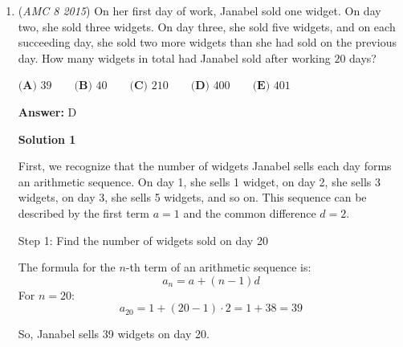 \begin{enumerate}
\textbf{Solution}

We know from the \href{https://artofproblemsolving.com/wiki/index.php?title=Triangle\_Inequality}{Triangle Inequality} that the last side, $s$, fulfills $s<5+19=24$. Adding $5+19$ to both sides of the inequality, we get $s+5+19<48$, and because $s+5+19$ is the perimeter of our triangle, $\boxed{\textbf{(D)}\ 48}$ is our answer.

 


 



\textbf{Solution 2}

$s$, fulfills $s<5+19=24$, meaning that s<24. The greatest value of s can be 23. 23+5+19 is 47. Since 48 is our nearest answer choice, the answer is $\boxed{\textbf{(D)}\ 48}$.-TheNerdWhoIsNerdy.

 minor edit by themathkidwoohooooo:the greatest value of s is 24-$e$, where $e$ represents an infinitesimal (a constant smaller than any positive number but not zero or negative. it is between the positives and 0. another way to think of it is $\frac {1} {\infty}$). NOT 23!!!!!!!!!!!!!!!

 


	\item (\textit{AMC 8 2015}) On her first day of work, Janabel sold one widget. On day two, she sold three widgets. On day three, she sold five widgets, and on each succeeding day, she sold two more widgets than she had sold on the previous day. How many widgets in total had Janabel sold after working $20$ days?


 $\textbf{(A) }39\qquad\textbf{(B) }40\qquad\textbf{(C) }210\qquad\textbf{(D) }400\qquad \textbf{(E) }401$

 \textbf{Answer: }D



\textbf{Solution 1}

First, we recognize that the number of widgets Janabel sells each day forms an arithmetic sequence. On day 1, she sells 1 widget, on day 2, she sells 3 widgets, on day 3, she sells 5 widgets, and so on. This sequence can be described by the first term \( a = 1 \) and the common difference \( d = 2 \).

 Step 1: Find the number of widgets sold on day 20

 The formula for the \( n \)-th term of an arithmetic sequence is:
 \[a_n = a + (n-1)d\]For \( n = 20 \):
 \[a_{20} = 1 + (20-1) \cdot 2 = 1 + 38 = 39\]

 So, Janabel sells 39 widgets on day 20.


\end{enumerate}
